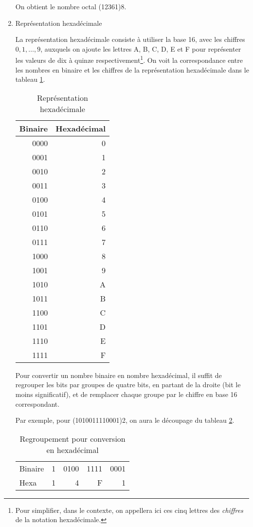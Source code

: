 \documentclass[letter, oneside]{book}
\begin{document}
\begin{enumerate}
On obtient le nombre octal (12361)8.

\item Représentation hexadécimale
\label{sec:orgf83fc23}

La représentation hexadécimale consiste à utiliser la base 16, avec
les chiffres \(0, 1, \ldots, 9\), auxquels on ajoute les lettres A, B,
C, D, E et F pour représenter les valeurs de dix à quinze
respectivement\footnote{Pour simplifier, dans le contexte, on appellera ici ces cinq
lettres des \emph{chiffres} de la notation hexadécimale.}. On voit la correspondance entre les nombres en binaire et les chiffres de la représentation hexadécimale dans le tableau \ref{tab:org01fd9e6}.

\begin{table}[htbp]
\caption{\label{tab:org01fd9e6}Représentation hexadécimale}
\centering
\begin{tabular}{rr}
Binaire & Hexadécimal\\[0pt]
\hline
0000 & 0\\[0pt]
0001 & 1\\[0pt]
0010 & 2\\[0pt]
0011 & 3\\[0pt]
0100 & 4\\[0pt]
0101 & 5\\[0pt]
0110 & 6\\[0pt]
0111 & 7\\[0pt]
1000 & 8\\[0pt]
1001 & 9\\[0pt]
1010 & A\\[0pt]
1011 & B\\[0pt]
1100 & C\\[0pt]
1101 & D\\[0pt]
1110 & E\\[0pt]
1111 & F\\[0pt]
\end{tabular}
\end{table}


Pour convertir un nombre binaire en nombre hexadécimal, il suffit de
regrouper les bits par groupes de quatre bits, en partant de la droite
(bit le moins significatif), et de remplacer chaque groupe par le
chiffre en base 16 correspondant.

Par exemple, pour (1010011110001)2, on aura le découpage du tableau
\ref{tab:orgc720bf5}.

\begin{table}[htbp]
\caption{\label{tab:orgc720bf5}Regroupement pour conversion en hexadécimal}
\centering
\begin{tabular}{lrrrr}
 &  &  &  & \\[0pt]
\hline
Binaire & 1 & 0100 & 1111 & 0001\\[0pt]
Hexa & 1 & 4 & F & 1\\[0pt]
\end{tabular}
\end{table}


\end{enumerate}
\end{document}
